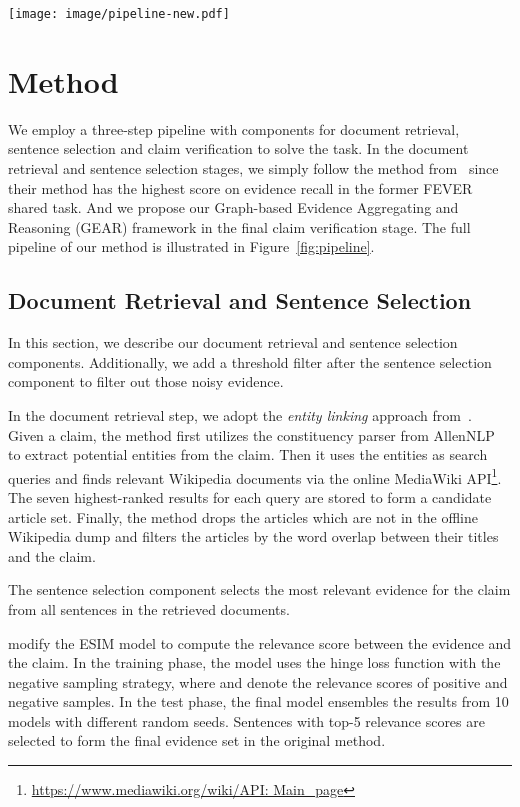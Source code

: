 \documentclass[11pt,a4paper]{article}
\begin{document}
\begin{figure*}[t]
    \centering
    \texttt{[image: image/pipeline-new.pdf]}
    \caption{The pipeline of our method. The GEAR framework is illustrated in the claim verification section. }
    \label{fig:pipeline}
\end{figure*}

\section{Method}

We employ a three-step pipeline with components for document retrieval, sentence selection and claim verification to solve the task. In the document retrieval and sentence selection stages, we simply follow the method from~ since their method has the highest score on evidence recall in the former FEVER shared task. And we propose our Graph-based Evidence Aggregating and Reasoning (GEAR) framework in the final claim verification stage. The full pipeline of our method is illustrated in Figure~\ref{fig:pipeline}.

\subsection{Document Retrieval and Sentence Selection}
In this section, we describe our document retrieval and sentence selection components. Additionally, we add a threshold filter after the sentence selection component to filter out those noisy evidence.

In the document retrieval step, we adopt the \emph{entity linking} approach from~. Given a claim, the method first utilizes the constituency parser from AllenNLP~\cite{gardner2018allennlp} to extract potential entities from the claim. Then it uses the entities as search queries and finds relevant Wikipedia documents via the online MediaWiki API\footnote{\url{https://www.mediawiki.org/wiki/API: Main_page}}. The seven highest-ranked results for each query are stored to form a candidate article set. Finally, the method drops the articles which are not in the offline Wikipedia dump and filters the articles by the word overlap between their titles and the claim. 

The sentence selection component selects the most relevant evidence for the claim from all sentences in the retrieved documents.

 modify the ESIM model to compute the relevance score between the evidence and the claim. In the training phase, the model uses the hinge loss function  with the negative sampling strategy, where  and  denote the relevance scores of positive and negative samples. In the test phase, the final model ensembles the results from 10 models with different random seeds. Sentences with top-5 relevance scores are selected to form the final evidence set in the original method.
\end{document}
